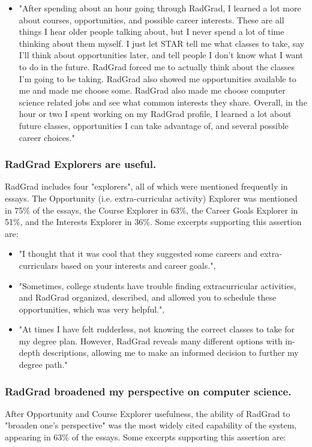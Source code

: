 \documentclass[acmsmall,nonacm]{acmart}
\begin{document}
\begin{itemize}[leftmargin=*]
\item "After spending about an hour going through RadGrad, I learned a lot more about courses, opportunities, and possible career interests. These are all things I hear older people talking about, but I never spend a lot of time thinking about them myself. I just let STAR tell me what classes to take, say I’ll think about opportunities later, and tell people I don’t know what I want to do in the future. RadGrad forced me to actually think about the classes I’m going to be taking. RadGrad also showed me opportunities available to me and made me choose some. RadGrad also made me choose computer science related jobs and see what common interests they share. Overall, in the hour or two I spent working on my RadGrad profile, I learned a lot about future classes, opportunities I can take advantage of, and several possible career choices."
\end{itemize}

\subsubsection{RadGrad Explorers are useful.} RadGrad includes four "explorers", all of which were mentioned frequently in essays. The Opportunity (i.e. extra-curricular activity) Explorer was mentioned in 75\% of the essays, the Course Explorer in 63\%, the Career Goals Explorer in 51\%, and the Interests Explorer in 36\%. Some excerpts supporting this assertion are:

\begin{itemize}[leftmargin=*]
\item "I thought that it was cool that they suggested some careers and extra-curriculars based on your interests and career goals.",
\item "Sometimes, college students have trouble finding extracurricular activities, and RadGrad organized, described, and allowed you to schedule these opportunities, which was very helpful.",
\item "At times I have felt rudderless, not knowing the correct classes to take for my degree plan. However, RadGrad reveals many different options with in-depth descriptions, allowing me to make an informed decision to further my degree path."
\end{itemize}

\subsubsection{RadGrad broadened my perspective on computer science.} After Opportunity and Course Explorer usefulness, the ability of RadGrad to "broaden one's perspective" was the most widely cited capability of the system, appearing in 63\% of the essays. Some excerpts supporting this assertion are:
\end{document}
